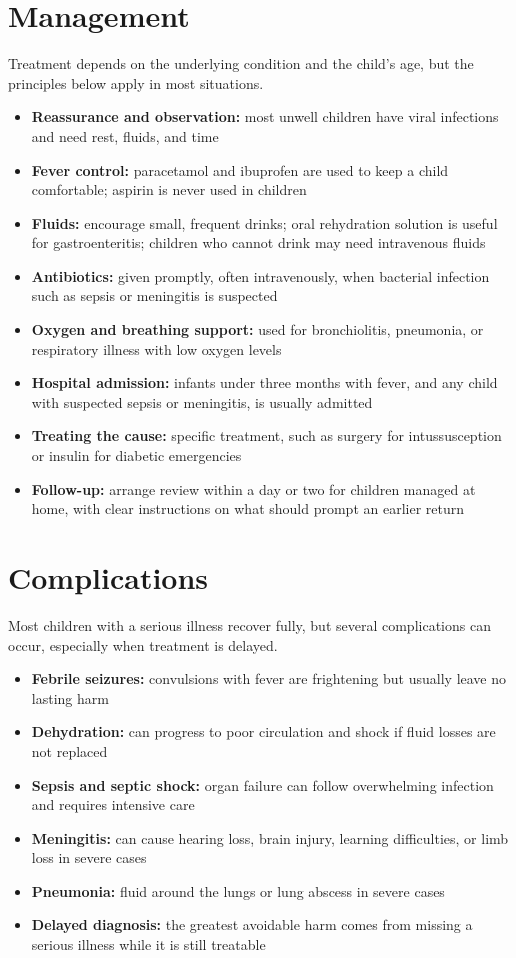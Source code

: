 \section*{Management}
Treatment depends on the underlying condition and the child's age, but the principles below apply in most situations.

\begin{itemize}
    \item \textbf{Reassurance and observation:} most unwell children have viral infections and need rest, fluids, and time
    \item \textbf{Fever control:} paracetamol and ibuprofen are used to keep a child comfortable; aspirin is never used in children
    \item \textbf{Fluids:} encourage small, frequent drinks; oral rehydration solution is useful for gastroenteritis; children who cannot drink may need intravenous fluids
    \item \textbf{Antibiotics:} given promptly, often intravenously, when bacterial infection such as sepsis or meningitis is suspected
    \item \textbf{Oxygen and breathing support:} used for bronchiolitis, pneumonia, or respiratory illness with low oxygen levels
    \item \textbf{Hospital admission:} infants under three months with fever, and any child with suspected sepsis or meningitis, is usually admitted
    \item \textbf{Treating the cause:} specific treatment, such as surgery for intussusception or insulin for diabetic emergencies
    \item \textbf{Follow-up:} arrange review within a day or two for children managed at home, with clear instructions on what should prompt an earlier return
\end{itemize}

\section*{Complications}
Most children with a serious illness recover fully, but several complications can occur, especially when treatment is delayed.

\begin{itemize}
    \item \textbf{Febrile seizures:} convulsions with fever are frightening but usually leave no lasting harm
    \item \textbf{Dehydration:} can progress to poor circulation and shock if fluid losses are not replaced
    \item \textbf{Sepsis and septic shock:} organ failure can follow overwhelming infection and requires intensive care
    \item \textbf{Meningitis:} can cause hearing loss, brain injury, learning difficulties, or limb loss in severe cases
    \item \textbf{Pneumonia:} fluid around the lungs or lung abscess in severe cases
    \item \textbf{Delayed diagnosis:} the greatest avoidable harm comes from missing a serious illness while it is still treatable
\end{itemize}

